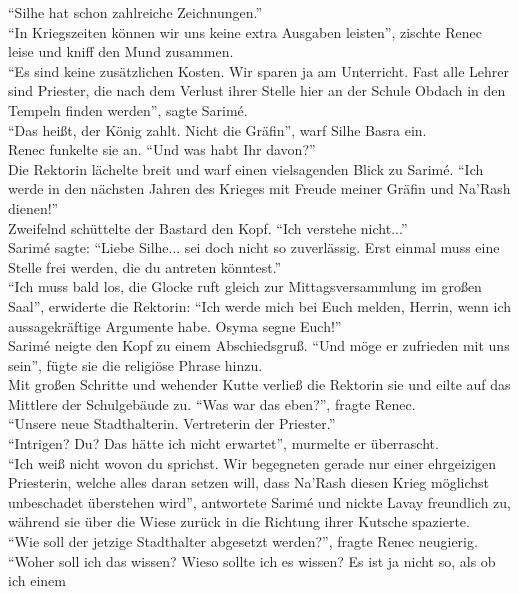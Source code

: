 ``Silhe hat schon zahlreiche Zeichnungen.''\\
``In Kriegszeiten können wir uns keine extra Ausgaben leisten'', zischte Renec leise und kniff den 
Mund zusammen.\\
``Es sind keine zusätzlichen Kosten. Wir sparen ja am Unterricht. Fast alle Lehrer sind Priester, 
die nach dem Verlust ihrer Stelle hier an der Schule Obdach in den Tempeln finden werden'', sagte 
Sarimé.\\
``Das heißt, der König zahlt. Nicht die Gräfin'', warf Silhe Basra ein.\\
Renec funkelte sie an. ``Und was habt Ihr davon?''\\
Die Rektorin lächelte breit und warf einen vielsagenden Blick zu Sarimé. ``Ich werde in den 
nächsten Jahren des Krieges mit Freude meiner Gräfin und Na'Rash dienen!''\\
Zweifelnd schüttelte der Bastard den Kopf. ``Ich verstehe nicht...''\\
Sarimé sagte: ``Liebe Silhe... sei doch nicht so zuverlässig. Erst einmal muss eine Stelle frei 
werden, die du antreten könntest.''\\
``Ich muss bald los, die Glocke ruft gleich zur Mittagsversammlung im großen Saal'', erwiderte die 
Rektorin: ``Ich werde mich bei Euch melden, Herrin, wenn ich aussagekräftige Argumente habe. Osyma 
segne Euch!''\\
Sarimé neigte den Kopf zu einem Abschiedsgruß. ``Und möge er zufrieden mit uns sein'', fügte sie 
die religiöse Phrase hinzu.\\
Mit großen Schritte und wehender Kutte verließ die Rektorin sie und eilte auf das Mittlere der 
Schulgebäude zu. ``Was war das eben?'', fragte Renec.\\
``Unsere neue Stadthalterin. Vertreterin der Priester.''\\
``Intrigen? Du? Das hätte ich nicht erwartet'', murmelte er überrascht.\\
``Ich weiß nicht wovon du sprichst. Wir begegneten gerade nur einer ehrgeizigen Priesterin, welche 
alles daran setzen will, dass Na'Rash diesen Krieg möglichst unbeschadet überstehen wird'', 
antwortete Sarimé und nickte Lavay freundlich zu, während sie über die Wiese zurück in die Richtung 
ihrer Kutsche spazierte.\\
``Wie soll der jetzige Stadthalter abgesetzt werden?'', fragte Renec neugierig.\\
``Woher soll ich das wissen? Wieso sollte ich es wissen? Es ist ja nicht so, als ob ich einem 
